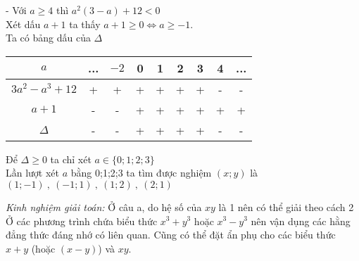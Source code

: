 \begin{vd}
{\begin{enumerate}
\begin{itemize}
                - Với $a \geq 4$ thì $a^2(3-a)+12<0$\\ Xét dấu $a+1$ ta thấy $a+1 \geq 0 \Leftrightarrow a\geq -1$.\\
                Ta có bảng dấu của $\Delta$
                \begin{center}
                    \begin{tabular}{|c|c|c|c|c|c|c|c|c|}
                        \hline
                        $a$ & ... & $-2$ & 0 & 1 & 2 & 3 & 4 & ... \\
                        \hline
                        $3a^2-a^3+12$ & + & + & + & + & + & + & - & - \\
                        \hline
                        $a+1$ & - & - & + & + & + & + & + & + \\
                        \hline
                        $\Delta $ & - & - & + & + & + & + & - & - \\
                        \hline
                    \end{tabular}
                \end{center}
                Để $\Delta \geq 0$ ta chỉ xét $a\in \{0;1;2;3\}$\\
                Lần lượt xét $a$ bằng 0;1;2;3 ta tìm được nghiệm $(x;y)$ là $(1;-1)\ ,\ (-1;1)\ ,\ (1;2)\ ,\ (2;1)$
            \end{itemize}
            \textit{Kinh nghiệm giải toán:} Ở câu a, do hệ số của $xy$ là 1 nên có thể giải theo cách 2\\
            Ở các phương trình chứa biểu thức $x^3+y^3$ hoặc $x^3-y^3$ nên vận dụng các hằng đẳng thức đáng nhớ có liên quan. Cũng có thể đặt ẩn phụ cho các biểu thức $x+y$ (hoặc $(x-y)$) và $xy$.
\end{enumerate}    
    }
\end{vd}

